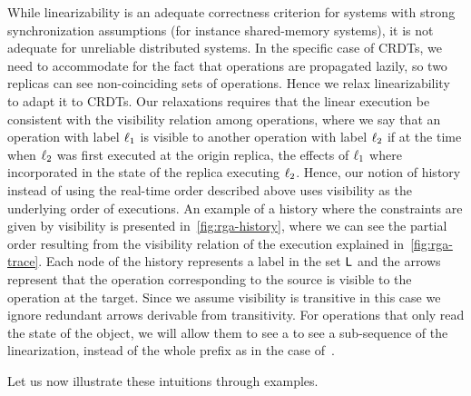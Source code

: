 While linearizability is an adequate correctness criterion for
systems with strong synchronization assumptions (for instance
shared-memory systems), it is not adequate for unreliable distributed
systems.
%
In the specific case of CRDTs, we need to accommodate for the fact
that operations are propagated lazily, so two replicas can see
non-coinciding sets of operations.
%
Hence we relax linearizability to adapt it to CRDTs.
%
Our relaxations requires that the linear execution be consistent with
the visibility relation among operations, where we say that an
operation with label $\ell_1$ is visible to another operation with
label $\ell_2$ if at the time when $\ell_2$ was first executed
at the origin replica, the effects of $\ell_1$ where incorporated
in the state of the replica executing $\ell_2$.
%
Hence, our notion of history instead of using the real-time order
described above uses visibility as the underlying order of executions.
%
An example of a history where the constraints are given by visibility
is presented in~\autoref{fig:rga-history}, where we can see the
partial order resulting from the visibility relation of the execution
explained in~\autoref{fig:rga-trace}. 
%
Each node of the history represents a label in the set $\mathsf{L}$
and the arrows represent that the operation corresponding to the
source is visible to the operation at the target.
%
Since we assume visibility is transitive in this case we ignore
redundant arrows derivable from transitivity.
%
For operations that only read the state of the object, we will allow
them to see a to see a sub-sequence of the linearization, instead of
the whole prefix as in the case of~\cite{HerlihyW90}.
%

Let us now illustrate these intuitions through examples.

